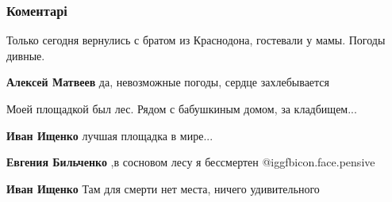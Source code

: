  
 
 
 
 
\subsubsection{Коментарі}
\label{sec:22_10_2021.fb.bilchenko_evgenia.1.detstaja_ploschadka.cmt}

\begin{itemize} %
Только сегодня вернулись с братом из Краснодона, гостевали у мамы. Погоды дивные.

\textbf{Алексей Матвеев} да, невозможные погоды, сердце захлебывается

Моей площадкой был лес. Рядом с бабушкиным домом, за кладбищем...🤭

\textbf{Иван Ищенко} лучшая площадка в мире...

\textbf{Евгения Бильченко} ,в сосновом лесу я бессмертен @igg{fbicon.face.pensive} 

\textbf{Иван Ищенко} Там для смерти нет места, ничего удивительного
\end{itemize} %
